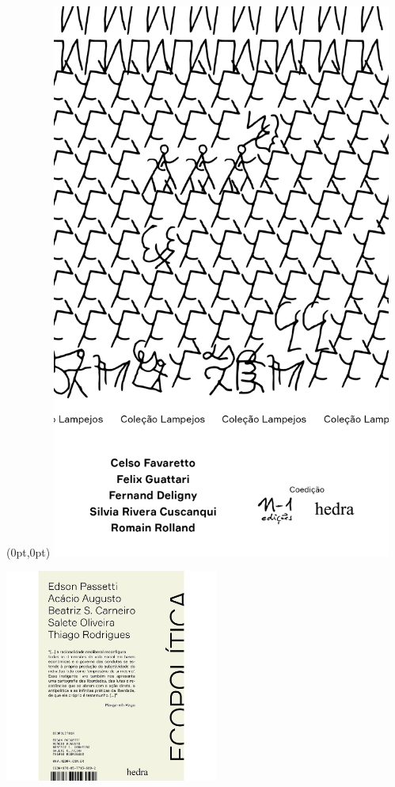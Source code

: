 \pagestyle{n-1}
\label{n-1}

\begin{textblock*}{5.625in}(0pt,0pt)%
\vspace*{-1.45cm}
\hspace*{-1.2cm}\includegraphics*[width=112mm]{./imgs/N-1.png}
\end{textblock*}

\pagebreak

\hspace{.5cm}

\begin{center}
\hspace*{-.5cm}\includegraphics[width=70mm]{eco.jpeg}
\end{center}

